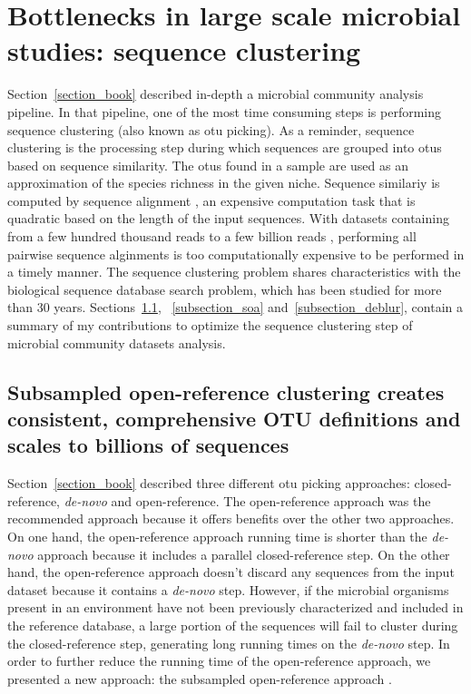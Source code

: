 \section{Bottlenecks in large scale microbial studies: sequence clustering}\label{section_bottlenecks}

Section~\ref{section_book} described in-depth a microbial community analysis pipeline.
In that pipeline, one of the most time consuming steps is performing
sequence clustering (also known as \gls{otu} picking). As a reminder, sequence
clustering is the processing step during which sequences are grouped into \gls{otu}s
based on sequence similarity. The \gls{otu}s found in a sample are used as an
approximation of the species richness in the given niche. Sequence similariy is
computed by sequence alignment \cite{Needleman1970, Smith1981}, an expensive
computation task that is quadratic based on the length of the input sequences. With
datasets containing from a few hundred thousand reads to a few billion
reads \cite{Goodwin2016}, performing all pairwise sequence alginments is too
computationally expensive to be performed in a timely manner. The sequence clustering
problem shares characteristics with the biological sequence database search problem,
which has been studied for more than 30 years. Sections~\ref{subsection_openref},
~\ref{subsection_soa} and~\ref{subsection_deblur}, contain a summary of my
contributions to optimize the sequence clustering step of microbial community
datasets analysis.

\subsection{Subsampled open-reference clustering creates consistent, comprehensive OTU definitions and scales to billions of sequences}\label{subsection_openref}

Section~\ref{section_book} described three different \gls{otu} picking approaches:
closed-reference, \emph{de-novo} and open-reference. The open-reference approach
was the recommended approach because it offers benefits over the other two
approaches. On one hand, the open-reference approach running time is shorter than
the \emph{de-novo} approach because it includes a parallel closed-reference step.
On the other hand, the open-reference approach doesn't discard any sequences from
the input dataset because it contains a \emph{de-novo} step. However, if the microbial
organisms present in an environment have not been previously characterized and included
in the reference database, a large portion of the sequences will fail to cluster
during the closed-reference step, generating long running times on the \emph{de-novo} step.
In order to further reduce the running time of the open-reference approach, we presented
a new approach: the subsampled open-reference approach \cite{Rideout2014}.

